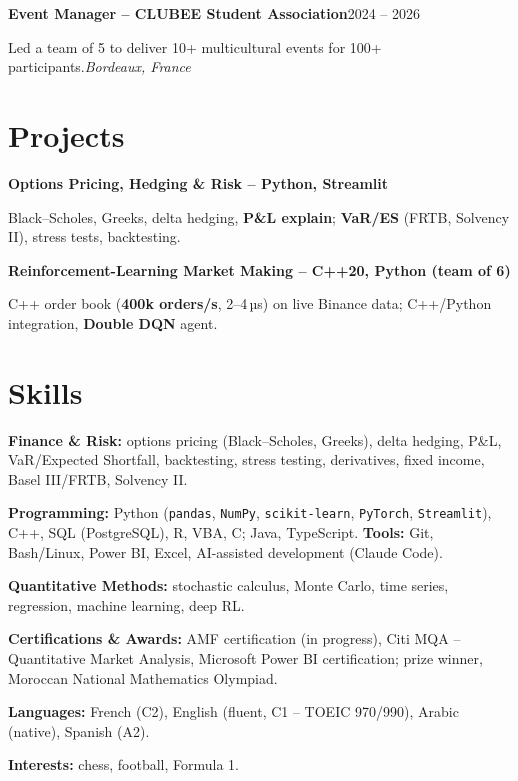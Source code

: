 \documentclass[a4paper,11pt]{article}
\newcommand{\entryline}[4]{%
  \textbf{#1}\hfill #2\par
  #3\hfill\textit{#4}\par}
\newcommand{\project}[2]{%
  \textbf{#1}\par
  #2\par}
\newcommand{\entrygap}{\par\vspace{3pt}}
\begin{document}
\entryline{Event Manager – CLUBEE Student Association}{2024 – 2026}
          {Led a team of 5 to deliver 10+ multicultural events for 100+ participants.}{Bordeaux, France}

\section{Projects}

\project{Options Pricing, Hedging \& Risk – Python, Streamlit}
{Black–Scholes, Greeks, delta hedging, \textbf{P\&L explain}; \textbf{VaR/ES} (FRTB, Solvency II), stress tests, backtesting.}
\entrygap

\project{Reinforcement-Learning Market Making – C++20, Python (team of 6)}
{C++ order book (\textbf{400k orders/s}, 2–4\,µs) on live Binance data; C++/Python integration, \textbf{Double DQN} agent.}

\section{Skills}

\textbf{Finance \& Risk:} options pricing (Black–Scholes, Greeks), delta hedging, P\&L, VaR/Expected Shortfall, backtesting, stress testing, derivatives, fixed income, Basel III/FRTB, Solvency II.\par
\textbf{Programming:} Python (\texttt{pandas}, \texttt{NumPy}, \texttt{scikit-learn}, \texttt{PyTorch}, \texttt{Streamlit}), C++, SQL (PostgreSQL), R, VBA, C; Java, TypeScript. \textbf{Tools:} Git, Bash/Linux, Power BI, Excel, AI-assisted development (Claude Code).\par
\textbf{Quantitative Methods:} stochastic calculus, Monte Carlo, time series, regression, machine learning, deep RL.\par
\textbf{Certifications \& Awards:} AMF certification (in progress), Citi MQA – Quantitative Market Analysis, Microsoft Power BI certification; prize winner, Moroccan National Mathematics Olympiad.\par
\textbf{Languages:} French (C2), English (fluent, C1 – TOEIC 970/990), Arabic (native), Spanish (A2).\par
\textbf{Interests:} chess, football, Formula 1.
\end{document}

